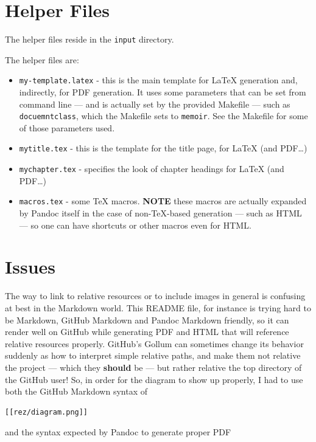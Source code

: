 \documentclass[oneside,]{memoir}
\begin{document}
\section{Helper Files}

The helper files reside in the \texttt{input} directory.

The helper files are:

\begin{itemize}
\item
  \texttt{my-template.latex} - this is the main template for LaTeX
  generation and, indirectly, for PDF generation. It uses some
  parameters that can be set from command line --- and is actually set
  by the provided Makefile --- such as \texttt{docuemntclass}, which the
  Makefile sets to \texttt{memoir}. See the Makefile for some of those
  parameters used.
\item
  \texttt{mytitle.tex} - this is the template for the title page, for
  LaTeX (and PDF\ldots{})
\item
  \texttt{mychapter.tex} - specifies the look of chapter headings for
  LaTeX (and PDF\ldots{})
\item
  \texttt{macros.tex} - some TeX macros. \textbf{NOTE} these macros are
  actually expanded by Pandoc itself in the case of non-TeX-based
  generation --- such as HTML --- so one can have shortcuts or other
  macros even for HTML.
\end{itemize}
\section{Issues}

The way to link to relative resources or to include images in general is
confusing at best in the Markdown world. This README file, for instance
is trying hard to be Markdown, GitHub Markdown and Pandoc Markdown
friendly, so it can render well on GitHub while generating PDF and HTML
that will reference relative resources properly. GitHub's Gollum can
sometimes change its behavior suddenly as how to interpret simple
relative paths, and make them not relative the project --- which they
\textbf{should} be --- but rather relative the top directory of the
GitHub user! So, in order for the diagram to show up properly, I had to
use both the GitHub Markdown syntax of

\begin{verbatim}
[[rez/diagram.png]]
\end{verbatim}
and the syntax expected by Pandoc to generate proper PDF
\end{document}
